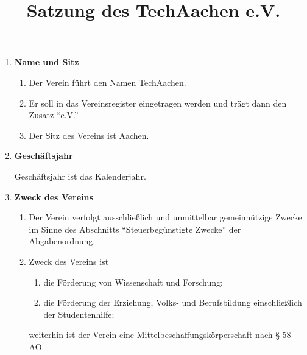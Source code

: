 \documentclass[german]{article}
\title{\textsf{\textbf{Satzung des TechAachen e.V.}}}
\author{}
\date{}
\newcommand{\paragr}[1]{\item \textsf{\textbf{#1}}}
\begin{document}
\maketitle

\begin{enumerate}
\paragr{Name und Sitz}

\begin{enumerate}

\item Der Verein führt den Namen TechAachen.

\item Er soll in das Vereinsregister eingetragen werden und trägt dann den Zusatz ``e.V.''

\item Der Sitz des Vereins ist Aachen.

\end{enumerate}

\paragr{Geschäftsjahr}

Geschäftsjahr ist das Kalenderjahr.


\paragr{Zweck des Vereins}
\begin{enumerate}

\item Der Verein verfolgt ausschließlich und unmittelbar gemeinnützige Zwecke im Sinne des Abschnitts ``Steuerbegünstigte Zwecke'' der Abgabenordnung.

\item Zweck des Vereins ist \label{zweck}
\begin{enumerate}
\item \label{zweck_wissenschaft_forschung} die Förderung von Wissenschaft und Forschung;
\item \label{zweck_bildung} die Förderung der Erziehung, Volks- und Berufsbildung einschließlich der Studentenhilfe;
\end{enumerate}
weiterhin ist der Verein eine Mittelbeschaffungskörperschaft nach § 58 AO.


\end{enumerate}
\end{enumerate}
\end{document}
